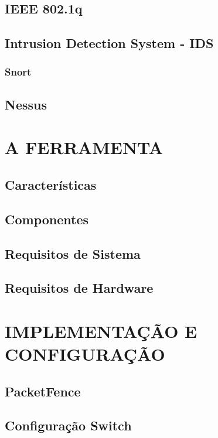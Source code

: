 \documentclass[12pt, brazil, ruledheader, pnumromarab,normaltoc]{abnt}
\begin{document}
\section{IEEE 802.1q}

\section{Intrusion Detection System - IDS}
\subsection{Snort}

\section{Nessus}


\chapter{A FERRAMENTA}

\section{Características}

\section{Componentes}

\section{Requisitos de Sistema}

\section{Requisitos de Hardware}


\chapter{IMPLEMENTAÇÃO E CONFIGURAÇÃO}

\section{PacketFence}

\section{Configuração Switch}
\end{document}
